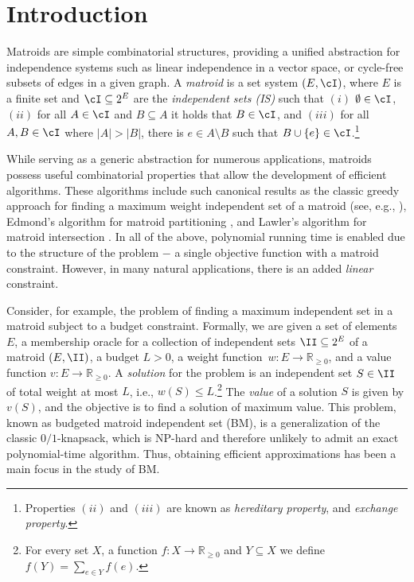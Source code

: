 	\section{Introduction}
	\label{sec:intro}
	
	Matroids are simple combinatorial structures, providing
	a unified abstraction for independence systems such as linear independence in a vector space, or cycle-free subsets of edges in a given graph. A {\em matroid} is a set system $(E, \cI)$, where $E$ is a finite set and $\cI \subseteq 2^E$ are the {\em independent sets (IS)} such that $(i)$ $\emptyset \in \cI$, $(ii)$ for all $A \in \cI$ and $B \subseteq A$ it holds that $B \in \cI$, and $(iii)$ for all $A,B \in \cI$ where $|A| > |B|$, there is $e \in A \setminus B$ such that $B \cup \{e\} \in \cI$.\footnote{Properties $(ii)$ and $(iii)$ are known as {\em hereditary property},
		and  {\em exchange property}.}
	
	While serving as a generic abstraction for numerous applications, matroids possess useful combinatorial properties that allow the development of efficient algorithms. 
	These algorithms include such canonical results as the classic greedy approach for finding a maximum weight independent set of a matroid (see, e.g., \cite{CLRS22}), Edmond's algorithm for matroid partitioning \cite{edmonds1965minimum}, and Lawler's algorithm for matroid intersection \cite{La75}. In all of the above, polynomial running time is enabled due to the structure of the problem $-$ a single objective function with a matroid constraint. However, in many natural applications, there is an added {\em linear} constraint. 
	
	Consider, for example, the problem of finding a maximum independent set in a matroid subject to a budget constraint. Formally, we are given 
	a set of elements $E$, a membership oracle for a collection of independent sets $\II \subseteq 2^{E}$ of a matroid $(E, \II)$, %
	a budget $L>0$, a weight function~$w:E\to \mathbb{R}_{\geq 0}$, and a value function $v:E\rightarrow \mathbb{R}_{\geq 0}$. A {\em solution} for the problem is an independent set $S \in \II$ of total weight at most $L$, i.e., $w(S) \leq L$.\footnote{For every set $X$, a function $f:X \rightarrow \mathbb{R}_{\geq 0}$ and $Y \subseteq X$ we define $f(Y) = \sum_{e \in Y} f(e)$.} The {\em value} of a solution $S$ is given by $v(S)$,
	and the objective is to find a solution of maximum value. This problem, known as {\sc budgeted matroid independent set (BM)}, is a generalization of the classic $0/1${\sc-knapsack}, which is NP-hard
	and therefore unlikely to admit an exact polynomial-time algorithm. Thus, obtaining efficient approximations has been a main focus in the study of BM.

